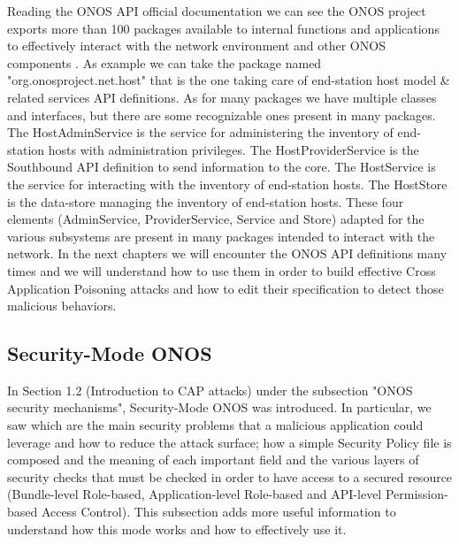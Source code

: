 \documentclass[a4paper,10pt]{memoir}
\begin{document}
Reading the ONOS API official documentation we can see the ONOS project exports more than 100 packages available to internal functions and applications to effectively interact with the network environment and other ONOS components \cite{apidocs}. As example we can take the package named "org.onosproject.net.host" that is the one taking care of end-station host model \& related services API definitions. As for many packages we have multiple classes and interfaces, but there are some recognizable ones present in many packages. The HostAdminService is the service for administering the inventory of end-station hosts with administration privileges. The HostProviderService is the Southbound API definition to send information to the core. The HostService is the service for interacting with the inventory of end-station hosts. The HostStore is the data-store managing the inventory of end-station hosts. These four elements (AdminService, ProviderService, Service and Store) adapted for the various subsystems are present in many packages intended to interact with the network. In the next chapters we will encounter the ONOS API definitions many times and we will understand how to use them in order to build effective Cross Application Poisoning attacks and how to edit their specification to detect those malicious behaviors.

\subsection{Security-Mode ONOS}

In Section 1.2 (Introduction to CAP attacks) under the subsection "ONOS security mechanisms", Security-Mode ONOS was introduced. In particular, we saw which are the main security problems that a malicious application could leverage and how to reduce the attack surface; how a simple Security Policy file is composed and the meaning of each important field and the various layers of security checks that must be checked in order to have access to a secured resource (Bundle-level Role-based, Application-level Role-based and API-level Permission-based Access Control). This subsection adds more useful information to understand how this mode works and how to effectively use it.
\medskip
\end{document}
